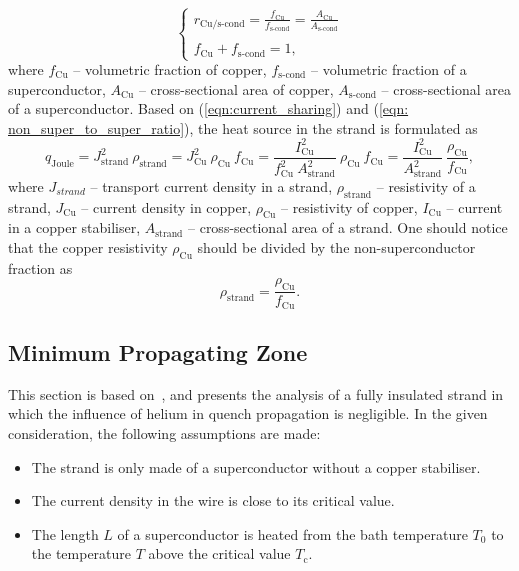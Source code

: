 \begin{equation}
    \left\{ \begin{array}{ll}
    r_\text{Cu/s-cond} = \frac{f_\text{Cu}}{f_\text{s-cond}} = \frac{A_\text{Cu}}{A_\text{s-cond}}\\ \\
    f_\text{Cu} + f_\text{s-cond} = 1,
    \end{array} \right.
    \label{eqn: non_super_to_super_ratio}
\end{equation}
where $f_\text{Cu}$ -- volumetric fraction of copper, $f_\text{s-cond}$ -- volumetric fraction of a superconductor, $A_\text{Cu}$ -- cross-sectional area of copper, $A_\text{s-cond}$ -- cross-sectional area of a superconductor. Based on (\ref{eqn:current_sharing}) and (\ref{eqn: non_super_to_super_ratio}), the heat source in the strand is formulated as 
\begin{equation}
    q_\text{Joule} = J_\text{strand}^2~\rho_\text{strand} = J_\text{Cu}^2~\rho_\text{Cu}~f_\text{Cu} = \frac{I_\text{Cu}^2}{f_\text{Cu}^2~A_\text{strand}^2}~\rho_\text{Cu}~f_\text{Cu} = \frac{I_\text{Cu}^2}{A_\text{strand}^2}~\frac{\rho_\text{Cu}}{f_\text{Cu}}, 
    \label{eqn: p_dens_equiv}
\end{equation}
where $J_{strand}$ -- transport current density in a strand, $\rho_\text{strand}$ -- resistivity of a strand, $J_\text{Cu}$ -- current density in copper, $\rho_\text{Cu}$ -- resistivity of copper, $I_\text{Cu}$ -- current in a copper stabiliser, $A_\text{strand}$ -- cross-sectional area of a strand. One should notice that the copper resistivity $\rho_\text{Cu}$ should be divided by the non-superconductor fraction as 
\begin{equation}
    \rho_\text{strand} = \frac{\rho_\text{Cu}}{f_\text{Cu}}.
    \label{eqn:strand_resistivity}
\end{equation}

\subsection{Minimum Propagating Zone}

This section is based on~\cite[p.~124]{superconducting_accelerator_magnets}, and presents the analysis of a fully insulated strand in which the influence of helium in quench propagation is negligible. In the given consideration, the following assumptions are made: 
\begin{itemize}
    \item The strand is only made of a superconductor without a copper stabiliser. 
    \item The current density in the wire is close to its critical value. 
    \item The length $L$ of a superconductor is heated from the bath temperature $T_0$ to the temperature $T$ above the critical value $T_\text{c}$.
\end{itemize}

